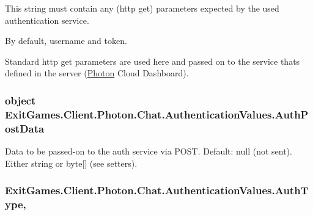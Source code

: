 This string must contain any (http get) parameters expected by the used authentication service. 

By default, username and token.

Standard http get parameters are used here and passed on to the service that\textquotesingle{}s defined in the server (\hyperlink{namespace_exit_games_1_1_client_1_1_photon}{Photon} Cloud Dashboard).
\subsubsection[{\texorpdfstring{Auth\+Post\+Data}{AuthPostData}}]{\setlength{\rightskip}{0pt plus 5cm}object Exit\+Games.\+Client.\+Photon.\+Chat.\+Authentication\+Values.\+Auth\+Post\+Data\hspace{0.3cm}{\ttfamily [get]}}\hypertarget{class_exit_games_1_1_client_1_1_photon_1_1_chat_1_1_authentication_values_a62980bf198ce9565c41d408a4df93310}{}\label{class_exit_games_1_1_client_1_1_photon_1_1_chat_1_1_authentication_values_a62980bf198ce9565c41d408a4df93310}


Data to be passed-\/on to the auth service via P\+O\+ST. Default\+: null (not sent). Either string or byte\mbox{[}\mbox{]} (see setters).

\subsubsection[{\texorpdfstring{Auth\+Type}{AuthType}}]{ Exit\+Games.\+Client.\+Photon.\+Chat.\+Authentication\+Values.\+Auth\+Type\hspace{0.3cm}{\ttfamily [get]}, {\ttfamily [set]}}\hypertarget{class_exit_games_1_1_client_1_1_photon_1_1_chat_1_1_authentication_values_a8736f9ea3a807749dfe4bdbab4d4ff5a}{}\label{class_exit_games_1_1_client_1_1_photon_1_1_chat_1_1_authentication_values_a8736f9ea3a807749dfe4bdbab4d4ff5a}


